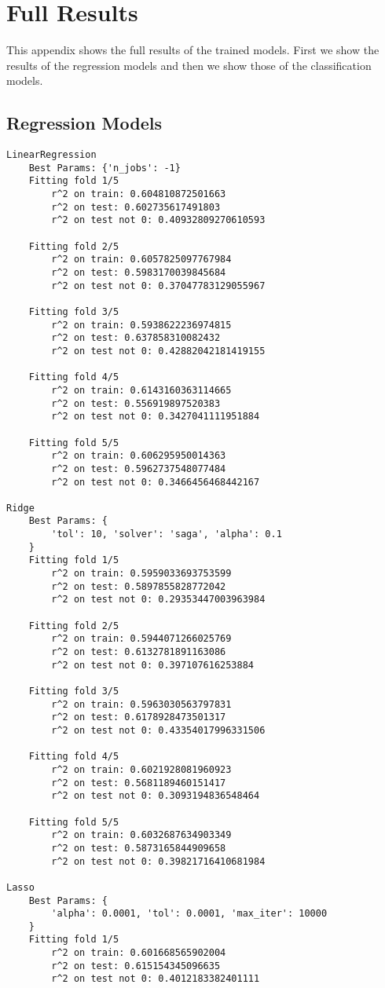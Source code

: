 \chapter{Full Results}\label{app:full_results}

This appendix shows the full results of the trained models. First we show the results of the regression models and then we show those of the classification models.

\section{Regression Models}
\begin{Verbatim}
LinearRegression
	Best Params: {'n_jobs': -1}
	Fitting fold 1/5
		r^2 on train: 0.604810872501663
		r^2 on test: 0.602735617491803
		r^2 on test not 0: 0.40932809270610593

	Fitting fold 2/5
		r^2 on train: 0.6057825097767984
		r^2 on test: 0.5983170039845684
		r^2 on test not 0: 0.37047783129055967

	Fitting fold 3/5
		r^2 on train: 0.5938622236974815
		r^2 on test: 0.637858310082432
		r^2 on test not 0: 0.42882042181419155

	Fitting fold 4/5
		r^2 on train: 0.6143160363114665
		r^2 on test: 0.556919897520383
		r^2 on test not 0: 0.3427041111951884

	Fitting fold 5/5
		r^2 on train: 0.606295950014363
		r^2 on test: 0.5962737548077484
		r^2 on test not 0: 0.3466456468442167

Ridge
	Best Params: {
		'tol': 10, 'solver': 'saga', 'alpha': 0.1
	}
	Fitting fold 1/5
		r^2 on train: 0.5959033693753599
		r^2 on test: 0.5897855828772042
		r^2 on test not 0: 0.29353447003963984

	Fitting fold 2/5
		r^2 on train: 0.5944071266025769
		r^2 on test: 0.6132781891163086
		r^2 on test not 0: 0.397107616253884

	Fitting fold 3/5
		r^2 on train: 0.5963030563797831
		r^2 on test: 0.6178928473501317
		r^2 on test not 0: 0.43354017996331506

	Fitting fold 4/5
		r^2 on train: 0.6021928081960923
		r^2 on test: 0.5681189460151417
		r^2 on test not 0: 0.3093194836548464

	Fitting fold 5/5
		r^2 on train: 0.6032687634903349
		r^2 on test: 0.5873165844909658
		r^2 on test not 0: 0.39821716410681984

Lasso
	Best Params: {
		'alpha': 0.0001, 'tol': 0.0001, 'max_iter': 10000
	}
	Fitting fold 1/5
		r^2 on train: 0.601668565902004
		r^2 on test: 0.615154345096635
		r^2 on test not 0: 0.4012183382401111


\end{Verbatim}

